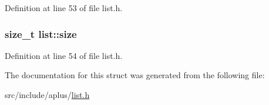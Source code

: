 Definition at line 53 of file list.\+h.

\hypertarget{structlist_ae581be90bd8eb7051528b61ad216de88}{
\subsubsection[{size}]{\setlength{\rightskip}{0pt plus 5cm}size\+\_\+t list\+::size}}\label{structlist_ae581be90bd8eb7051528b61ad216de88}


Definition at line 54 of file list.\+h.



The documentation for this struct was generated from the following file\+:\begin{DoxyCompactItemize}
\item 
src/include/aplus/\hyperlink{list_8h}{list.\+h}\end{DoxyCompactItemize}
